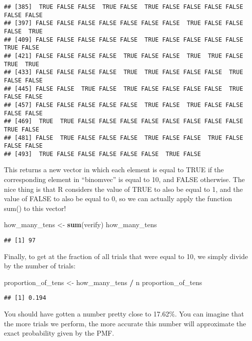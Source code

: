 \documentclass[
]{book}
\newenvironment{Shaded}{\begin{snugshade}}{\end{snugshade}}
\newcommand{\KeywordTok}[1]{\textcolor[rgb]{0.13,0.29,0.53}{\textbf{#1}}}
\newcommand{\NormalTok}[1]{#1}
\newcommand{\OperatorTok}[1]{\textcolor[rgb]{0.81,0.36,0.00}{\textbf{#1}}}
\newcommand{\StringTok}[1]{\textcolor[rgb]{0.31,0.60,0.02}{#1}}
\begin{document}
\begin{verbatim}
## [385]  TRUE FALSE FALSE  TRUE FALSE  TRUE FALSE FALSE FALSE FALSE FALSE FALSE
## [397] FALSE FALSE FALSE FALSE FALSE FALSE FALSE  TRUE FALSE FALSE FALSE  TRUE
## [409] FALSE FALSE FALSE FALSE FALSE  TRUE FALSE FALSE FALSE FALSE  TRUE FALSE
## [421] FALSE FALSE FALSE FALSE  TRUE FALSE FALSE  TRUE  TRUE FALSE  TRUE  TRUE
## [433] FALSE FALSE FALSE FALSE  TRUE  TRUE FALSE FALSE FALSE  TRUE FALSE FALSE
## [445] FALSE FALSE  TRUE FALSE  TRUE FALSE FALSE FALSE FALSE  TRUE FALSE FALSE
## [457] FALSE FALSE FALSE FALSE FALSE  TRUE FALSE  TRUE FALSE FALSE FALSE FALSE
## [469]  TRUE  TRUE FALSE FALSE FALSE FALSE FALSE FALSE FALSE FALSE  TRUE FALSE
## [481] FALSE  TRUE FALSE FALSE FALSE  TRUE FALSE FALSE  TRUE FALSE FALSE FALSE
## [493]  TRUE FALSE FALSE FALSE FALSE FALSE  TRUE FALSE
\end{verbatim}

This returns a new vector in which each element is equal to TRUE if the corresponding element in ``binomvec'' is equal to 10, and FALSE otherwise. The nice thing is that R considers the value of TRUE to also be equal to 1, and the value of FALSE to also be equal to 0, so we can actually apply the function sum() to this vector!

\begin{Shaded}
\begin{Highlighting}[]
\NormalTok{how\_many\_tens \textless{}{-}}\StringTok{ }\KeywordTok{sum}\NormalTok{(verify)}
\NormalTok{how\_many\_tens}
\end{Highlighting}
\end{Shaded}

\begin{verbatim}
## [1] 97
\end{verbatim}

Finally, to get at the fraction of all trials that were equal to 10, we simply divide by the number of trials:

\begin{Shaded}
\begin{Highlighting}[]
\NormalTok{proportion\_of\_tens \textless{}{-}}\StringTok{ }\NormalTok{how\_many\_tens }\OperatorTok{/}\StringTok{ }\NormalTok{n}
\NormalTok{proportion\_of\_tens}
\end{Highlighting}
\end{Shaded}

\begin{verbatim}
## [1] 0.194
\end{verbatim}

You should have gotten a number pretty close to 17.62\%. You can imagine that the more trials we perform, the more accurate this number will approximate the exact probability given by the PMF.
\end{document}
